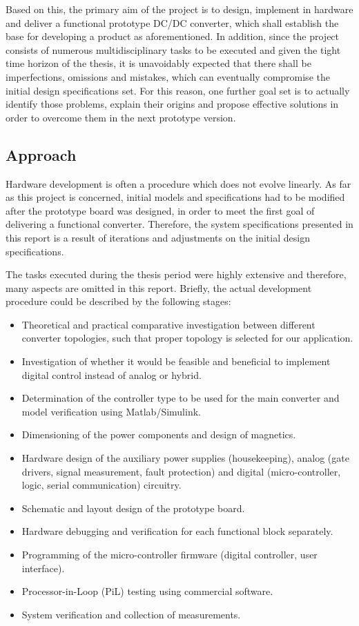 Based on this, the primary aim of the project is to design, implement in hardware and deliver a functional prototype DC/DC converter, which shall establish the base for developing a product as aforementioned. In addition, since the project consists of numerous multidisciplinary tasks to be executed and given the tight time horizon of the thesis, it is unavoidably expected that there shall be imperfections, omissions and mistakes, which can eventually compromise the initial design specifications set. For this reason, one further goal set is to actually identify those problems, explain their origins and propose effective solutions in order to overcome them in the next prototype version.

\subsection{Approach}

Hardware development is often a procedure which does not evolve linearly. As far as this project is concerned, initial models and specifications had to be modified after the prototype board was designed, in order to meet the first goal of delivering a functional converter. Therefore, the system specifications presented in this report is a result of iterations and adjustments on the initial design specifications.

The tasks executed during the thesis period were highly extensive and therefore, many aspects are omitted in this report. Briefly, the actual development procedure could be described by the following stages:

\begin{itemize}
    \item Theoretical and practical comparative investigation between different converter topologies, such that proper topology is selected for our application.
    \item Investigation of whether it would be feasible and beneficial to implement digital control instead of analog or hybrid.
    \item Determination of the controller type to be used for the main converter and model verification using Matlab/Simulink.
    \item Dimensioning of the power components and design of magnetics.
    \item Hardware design of the auxiliary power supplies (housekeeping), analog (gate drivers, signal measurement, fault protection) and digital (micro-controller, logic, serial communication) circuitry.
    \item Schematic and layout design of the prototype board.
    \item Hardware debugging and verification for each functional block separately.
    \item Programming of the micro-controller firmware (digital controller, user interface).
    \item Processor-in-Loop (PiL) testing using commercial software.
    \item System verification and collection of measurements.
    \end{itemize}

